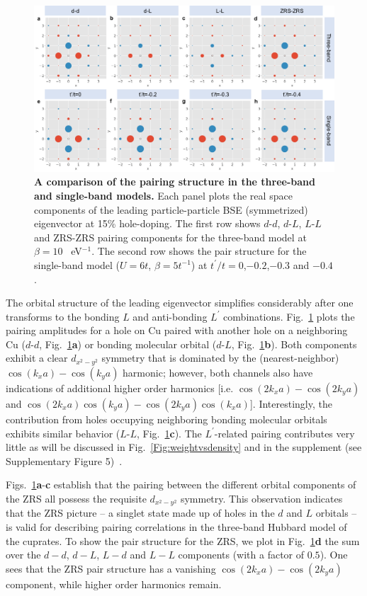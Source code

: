 \documentclass[fleqn,twocolumn,11pt]{wlscirep}
\begin{document}
\begin{figure}[ht]
\centering
\includegraphics[width=\linewidth]{./Figures/Figure3.pdf}
\caption{{\bf A comparison of the pairing structure in the three-band and single-band models.} Each panel plots the real space components of the leading  particle-particle  BSE  (symmetrized) eigenvector at 15\% hole-doping. The first row shows $d$-$d$, $d$-$L$, $L$-$L$ and ZRS-ZRS pairing components for the three-band model at $\beta=10$ ~eV$^{-1}$. The second row shows the pair structure for the single-band model ($U=6t$, $\beta =5t^{-1}$) at $t^\prime/t=0$,$-0.2$,$-0.3$ and $-0.4$.}
\label{Fig:tbvssb}
\end{figure}

The orbital structure of the leading eigenvector simplifies considerably after one transforms to the bonding $L$ and anti-bonding $L^\prime$ combinations. Fig.~\ref{Fig:tbvssb} plots the pairing amplitudes for a hole on Cu paired with another hole on a neighboring Cu ($d$-$d$, Fig.~\ref{Fig:tbvssb}{\bf a}) or bonding molecular orbital ($d$-$L$, Fig.~\ref{Fig:tbvssb}{\bf b}). Both components exhibit a clear $d_{x^2-y^2}$ symmetry that is dominated by the (nearest-neighbor) $\cos(k_xa)-\cos(k_ya)$ harmonic; however, both channels also have indications of additional higher order harmonics [i.e. $\cos(2k_xa)-\cos(2k_ya)$ and $\cos(2k_xa)\cos(k_ya)-\cos(2k_ya)\cos(k_xa)$]. Interestingly, the contribution from holes occupying neighboring bonding molecular orbitals exhibits similar behavior ($L$-$L$, Fig.~\ref{Fig:tbvssb}{\bf c}). The $L^\prime$-related pairing contributes very little as will be discussed in Fig.~\ref{Fig:weightvsdensity} and in the supplement (see Supplementary Figure 5)~\cite{supplement}. 

Figs.~\ref{Fig:tbvssb}{\bf a}-{\bf c} establish that the pairing between the different orbital components of the ZRS all possess the requisite $d_{x^2-y^2}$ symmetry. This observation indicates that the ZRS picture  -- a singlet state made up of holes in the $d$ and $L$ orbitals -- is valid for describing pairing correlations in the three-band Hubbard model of the cuprates. To show the pair structure for the ZRS, we plot in Fig.~\ref{Fig:tbvssb}{\bf d} the sum over the $d-d$, $d-L$, $L-d$ and $L-L$ components (with a factor of $0.5$). One sees that the ZRS pair structure has a vanishing $\cos(2k_xa)-\cos(2k_ya)$ component, while higher order harmonics remain. 
\end{document}
